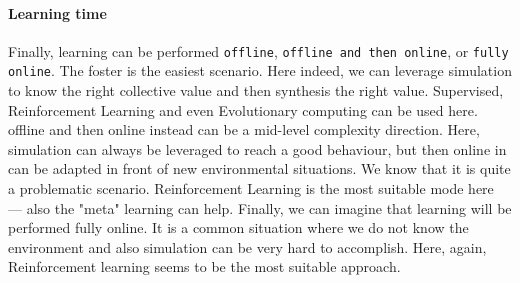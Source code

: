 \documentclass[
  twocolumn,
]{ceurart}
\begin{document}
\paragraph{Learning time}
 Finally, learning can be performed \texttt{offline}, \texttt{offline and then online}, or \texttt{fully online}.
 The foster is the easiest scenario.
 Here indeed, we can leverage simulation to know the right collective value and then synthesis the right value. 
 Supervised, Reinforcement Learning and even Evolutionary computing can be used here. 
 offline and then online instead can be a mid-level complexity direction.
 Here, simulation can always be leveraged to reach a good behaviour, but then online in can be adapted in front of new environmental situations. 
 We know that it is quite a problematic scenario. 
 Reinforcement Learning is the most suitable mode here --- also the "meta" learning can help.
 Finally, we can imagine that learning will be performed fully online. 
 It is a common situation where we do not know the environment and also simulation can be very hard to accomplish. 
 Here, again, Reinforcement learning seems to be the most suitable approach.

 
\end{document}

